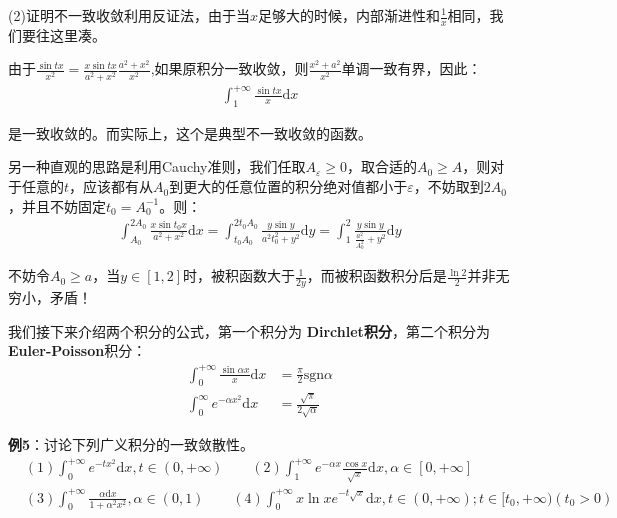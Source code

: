 \documentclass{ctexart}
\let\oldtextbf\textbf
\renewcommand{\textbf}[1]{\textcolor{brown!50!red}{\oldtextbf{#1}}}
\begin{document}
(2)证明不一致收敛利用反证法，由于当$x$足够大的时候，内部渐进性和$\frac{1}{x}$相同，我们要往这里凑。

由于$\frac{\sin tx}{x^2}=\frac{x \sin tx}{a^2+x^2}\frac{a^2+x^2}{x^2}$,如果原积分一致收敛，则$\frac{x^2+a^2}{x^2}$单调一致有界，因此：
\begin{align*}
    \int_1^{+\infty}\frac{\sin tx}{x}\mathrm{d}x
\end{align*}

是一致收敛的。而实际上，这个是典型不一致收敛的函数。
\begin{tcolorbox}[
    colback=bac1,     %
    colframe=fra1,   %
    coltitle=white!80,    
    coltext=tex1,%
    title=另一种办法,
    fonttitle=\bfseries,        %
    arc=2mm,                     %
    breakable
]
另一种直观的思路是利用Cauchy准则，我们任取$A_\varepsilon\geq 0$，取合适的$A_0\geq A$，则对于任意的$t$，应该都有从$A_0$到更大的任意位置的积分绝对值都小于$\varepsilon$，不妨取到$2A_0$，并且不妨固定$t_0=A_0^{-1}$。则：
\begin{align*}
    \int_{A_0}^{2A_0}\frac{x\sin t_0 x}{a^2+x^2}\mathrm{d}x=\int_{t_0A_0}^{2t_0A_0}\frac{y\sin y}{a^2t_0^2+y^2}\mathrm{d}y=\int_1^2\frac{y\sin y}{\frac{a^2}{A_0^2}+y^2}\mathrm{d}y
\end{align*}

不妨令$A_0\geq a$，当$y\in[1,2]$时，被积函数大于$\frac{1}{2y}$，而被积函数积分后是$\frac{\ln 2}{2}$并非无穷小，矛盾！
\end{tcolorbox}
\begin{tcolorbox}[
    colback=bac2,     %
    colframe=fra2,   %
    coltitle=white,             %
    coltext=tex2,
    title=常见辅助积分公式,
    fonttitle=\bfseries,        %
    arc=3mm,                    %
    breakable,
]
我们接下来介绍两个积分的公式，第一个积分为\textbf{\color{brown!50!red} Dirchlet积分}，第二个积分为\textbf{\color{brown!50!red}Euler-Poisson}积分：
\begin{align*}
    \int_0^{+\infty}\frac{\sin \alpha x}{x}\mathrm{d}x&=\frac{\pi}{2}\text{sgn}\alpha\\
    \int_0^\infty e^{-\alpha x^2}\mathrm{d}x&=\frac{\sqrt{\pi}}{2\sqrt{\alpha}}
\end{align*}
\end{tcolorbox}

\textbf{\color{brown!50!red}例5}：讨论下列广义积分的一致敛散性。
\begin{align*}
   & (1)\int_0^{+\infty}e^{-tx^2}\mathrm{d}x,t\in(0,+\infty) \qquad (2)\int_1^{+\infty}e^{-\alpha x}\frac{\cos x}{\sqrt{x}}\mathrm{d}x,\alpha\in[0,+\infty]\\
    &(3)\int_0^{+\infty}\frac{\alpha\mathrm{d}x}{1+\alpha^2x^2},\alpha\in(0,1)\qquad (4)\int_0^{+\infty}x\ln x e^{-t\sqrt{x}}\mathrm{d}x,t\in(0,+\infty);t\in[t_0,+\infty)(t_0>0)
\end{align*}
\end{document}
